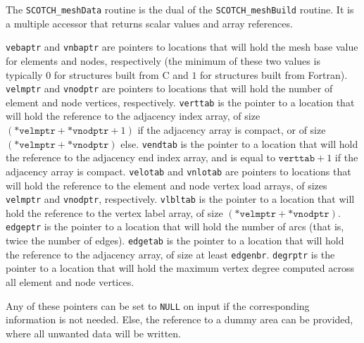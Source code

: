 \begin{itemize}
\progdes

The {\tt SCOTCH\_meshData} routine is the dual of the
{\tt SCOTCH\_\lbt mesh\lbo Build} routine. It is a multiple
accessor that returns scalar values and array references.

{\tt vebaptr} and {\tt vnbaptr} are pointers to locations that
will hold the mesh base value for elements and nodes, respectively
(the minimum of these two values is typically $0$ for structures built
from C and $1$ for structures built from Fortran).
{\tt velmptr} and {\tt vnodptr} are pointers to locations that
will hold the number of element and node vertices, respectively.
{\tt verttab} is the pointer to a location that will hold the reference to
the adjacency index array, of size $(\mathtt{*velmptr} +
\mathtt{*vnodptr} + 1)$ if the adjacency array is compact, or
of size $(\mathtt{*velmptr} + \mathtt{*vnodptr})$ else.
{\tt vendtab} is the pointer to a location that will hold the
reference to the adjacency end index array, and is equal to
$\mathtt{verttab} + 1$ if the adjacency array is compact.
{\tt velotab} and {\tt vnlotab} are pointers to locations that will
hold the reference to the element and node vertex load arrays, of
sizes {\tt *velmptr} and {\tt *vnodptr}, respectively.
{\tt vlbltab} is the pointer to a location that will hold the reference to
the vertex label array, of size $(\mathtt{*velmptr} + \mathtt{*vnodptr})$.
{\tt edgeptr} is the pointer to a location that will hold the number of arcs
(that is, twice the number of edges).
{\tt edgetab} is the pointer to a location that will hold the reference to
the adjacency array, of size at least {\tt edgenbr}.
{\tt degrptr} is the pointer to a location that will hold the maximum
vertex degree computed across all element and node vertices.

Any of these pointers can be set to {\tt NULL} on input if the
corresponding information is not needed. Else, the reference to a
dummy area can be provided, where all unwanted data will be written.


\end{itemize}
